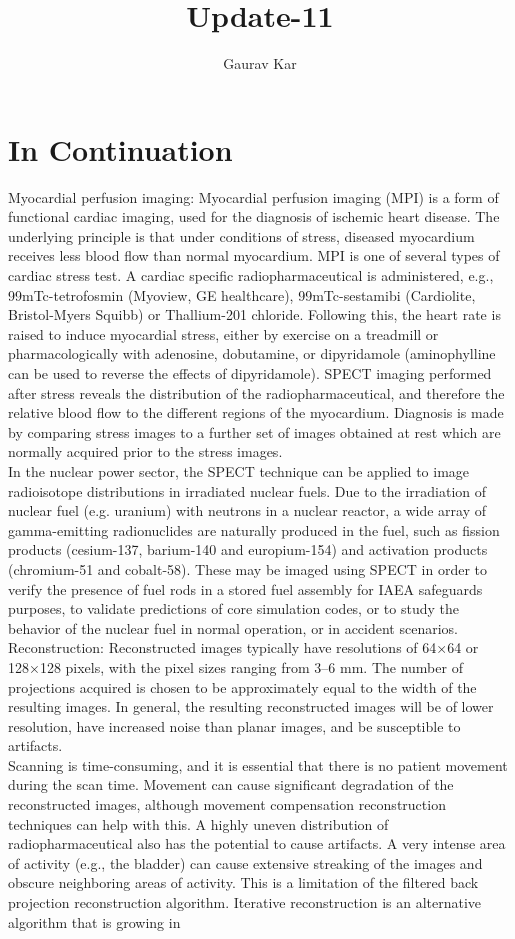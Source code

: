 \documentclass{article}
\title{Update-11}
\author{Gaurav Kar}
\date{}
\begin{document}
\maketitle

\section{In Continuation}
Myocardial perfusion imaging: Myocardial perfusion imaging (MPI) is a form of functional cardiac imaging, used for the diagnosis of ischemic heart disease. The underlying principle is that under conditions of stress, diseased myocardium receives less blood flow than normal myocardium. MPI is one of several types of cardiac stress test. A cardiac specific radiopharmaceutical is administered, e.g., 99mTc-tetrofosmin (Myoview, GE healthcare), 99mTc-sestamibi (Cardiolite, Bristol-Myers Squibb) or Thallium-201 chloride. Following this, the heart rate is raised to induce myocardial stress, either by exercise on a treadmill or pharmacologically with adenosine, dobutamine, or dipyridamole (aminophylline can be used to reverse the effects of dipyridamole). SPECT imaging performed after stress reveals the distribution of the radiopharmaceutical, and therefore the relative blood flow to the different regions of the myocardium. Diagnosis is made by comparing stress images to a further set of images obtained at rest which are normally acquired prior to the stress images.\\In the nuclear power sector, the SPECT technique can be applied to image radioisotope distributions in irradiated nuclear fuels. Due to the irradiation of nuclear fuel (e.g. uranium) with neutrons in a nuclear reactor, a wide array of gamma-emitting radionuclides are naturally produced in the fuel, such as fission products (cesium-137, barium-140 and europium-154) and activation products (chromium-51 and cobalt-58). These may be imaged using SPECT in order to verify the presence of fuel rods in a stored fuel assembly for IAEA safeguards purposes, to validate predictions of core simulation codes, or to study the behavior of the nuclear fuel in normal operation,  or in accident scenarios.\\Reconstruction: Reconstructed images typically have resolutions of 64×64 or 128×128 pixels, with the pixel sizes ranging from 3–6 mm. The number of projections acquired is chosen to be approximately equal to the width of the resulting images. In general, the resulting reconstructed images will be of lower resolution, have increased noise than planar images, and be susceptible to artifacts.\\Scanning is time-consuming, and it is essential that there is no patient movement during the scan time. Movement can cause significant degradation of the reconstructed images, although movement compensation reconstruction techniques can help with this. A highly uneven distribution of radiopharmaceutical also has the potential to cause artifacts. A very intense area of activity (e.g., the bladder) can cause extensive streaking of the images and obscure neighboring areas of activity. This is a limitation of the filtered back projection reconstruction algorithm. Iterative reconstruction is an alternative algorithm that is growing in 
\end{document}
